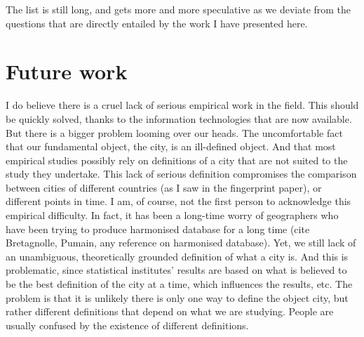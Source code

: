 The list is still long, and gets more and more speculative as we deviate from
the questions that are directly entailed by the work I have presented here.


\section{Future work}
\label{sec:future_work}

I do believe there is a cruel lack of serious empirical work in the field. This
should be quickly solved, thanks to the information technologies that are now
available. But there is a bigger problem looming over our heads. The
uncomfortable fact that our fundamental object, the city, is an ill-defined
object. And that most empirical studies possibly rely on definitions of a city
that are not suited to the study they undertake. 
This lack of serious definition compromises the comparison between cities of
different countries (as I saw in the fingerprint paper), or different points in
time. I am, of course, not the first person to acknowledge this empirical
difficulty. In fact, it has been a long-time worry of geographers who have been
trying to produce harmonised database for a long time (cite
Bretagnolle, Pumain, any reference on harmonised database). Yet, we still lack
of an unambiguous, theoretically grounded definition of what a city is. And this
is problematic, since statistical institutes' results are based on what is
believed to be the best definition of the city at a time, which influences the
results, etc.
The problem is that it is unlikely there is only one way to define the object
city, but rather different definitions that depend on what we are studying.
People are usually confused by the existence of different definitions.


